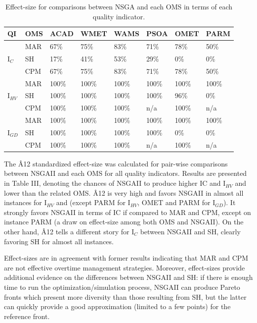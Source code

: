 \documentclass[conference]{IEEEtran}
\begin{document}
\begin{table}[htbp]
  \centering
  \caption{Effect-size for comparisons between NSGA and each OMS in terms of each quality indicator.}
    \begin{tabular}{p{0.6cm} p{0.6cm} p{0.65cm} p{0.65cm}p{0.65cm}p{0.65cm}p{0.65cm}p{0.65cm}}
    \toprule
    \textbf{QI} & \textbf{OMS} & \textbf{ACAD} & \textbf{WMET} & \textbf{WAMS} & \textbf{PSOA} & \textbf{OMET} & \textbf{PARM} \\
    \midrule
    \multirow{3}[1]{*}{I$_{C}$} & MAR   & 67\%  & 75\%  & 83\%  & 71\%  & 78\%  & 50\% \\
          & SH    & 17\%  & 41\%  & 53\%  & 29\%  & 0\%   & 0\% \\
          & CPM   & 67\%  & 75\%  & 83\%  & 71\%  & 78\%  & 50\% \\
    \multirow{3}[2]{*}{I$_{HV}$} & MAR   & 100\% & 100\% & 100\% & 100\% & 100\% & 100\% \\
          & SH    & 100\% & 100\% & 100\% & 100\% & 96\%  & 0\% \\
          & CPM   & 100\% & 100\% & 100\% & n/a   & 100\% & n/a \\
    \multirow{3}[2]{*}{I$_{GD}$} & MAR   & 100\% & 100\% & 100\% & 100\% & 100\% & 100\% \\
          & SH    & 100\% & 100\% & 100\% & 100\% & 0\%   & 0\% \\
          & CPM   & 100\% & 100\% & 100\% & n/a   & 100\% & n/a \\
    \bottomrule
    \end{tabular}%
\end{table}%

The Â12 standardized effect-size was calculated for pair-wise comparisons between NSGAII and each OMS for all quality indicators. Results are presented in Table III, denoting the chances of NSGAII to produce higher IC and I$_{HV}$ and lower  than the related OMS. Â12 is very high and favors NSGAII in almost all instances for I$_{HV}$ and  (except PARM for I$_{HV}$, OMET and PARM for I$_{GD}$). It strongly favors NSGAII in terms of IC if compared to MAR and CPM, except on instance PARM (a draw on effect-size among both OMS and NSGAII). On the other hand, Â12 tells a different story for I$_{C}$ between NSGAII and SH, clearly favoring SH for almost all instances. 

Effect-sizes are in agreement with former results indicating that MAR and CPM are not effective overtime management strategies. Moreover, effect-sizes provide additional evidence on the differences between NSGAII and SH: if there is enough time to run the optimization/simulation process, NSGAII can produce Pareto fronts which present more diversity than those resulting from SH, but the latter can quickly provide a good approximation (limited to a few points) for the reference front.
\end{document}
